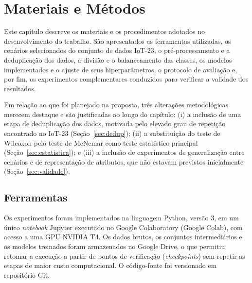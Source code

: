 
\chapter{Materiais e Métodos}
\label{cap:metodos}

Este capítulo descreve os materiais e os procedimentos adotados no desenvolvimento do trabalho. São apresentados as ferramentas utilizadas, os cenários selecionados do conjunto de dados IoT-23, o pré-processamento e a deduplicação dos dados, a divisão e o balanceamento das classes, os modelos implementados e o ajuste de seus hiperparâmetros, o protocolo de avaliação e, por fim, os experimentos complementares conduzidos para verificar a validade dos resultados.

Em relação ao que foi planejado na proposta, três alterações metodológicas merecem destaque e são justificadas ao longo do capítulo: (i) a inclusão de uma etapa de deduplicação dos dados, motivada pelo elevado grau de repetição encontrado no IoT-23 (Seção~\ref{sec:dedup}); (ii) a substituição do teste de Wilcoxon pelo teste de McNemar como teste estatístico principal (Seção~\ref{sec:estatistica}); e (iii) a inclusão de experimentos de generalização entre cenários e de representação de atributos, que não estavam previstos inicialmente (Seção~\ref{sec:validade}).

\section{Ferramentas}
\label{sec:ferramentas}

Os experimentos foram implementados na linguagem Python, versão 3, em um único \textit{notebook} Jupyter executado no Google Colaboratory (Google Colab), com acesso a uma GPU NVIDIA T4. Os dados brutos, os conjuntos intermediários e os modelos treinados foram armazenados no Google Drive, o que permitiu retomar a execução a partir de pontos de verificação (\textit{checkpoints}) sem repetir as etapas de maior custo computacional. O código-fonte foi versionado em repositório Git.

